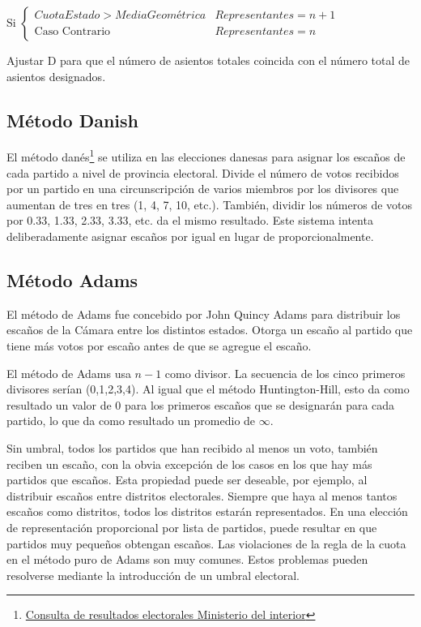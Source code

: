 \documentclass[12pt,a4paper,]{book}
\let\rmarkdownfootnote\footnote%
\def\footnote{\protect\rmarkdownfootnote}
\numberwithin{dummy}{section}
\theoremstyle{ocrenumbox}
\theoremstyle{blacknumex}
\theoremstyle{blacknumbox}
\theoremstyle{ocrenum}
\theoremstyle{ocrenum}
\begin{document}
Si
\(\begin{cases}CuotaEstado>MediaGeométrica & Representantes = n+1\\\textrm{Caso Contrario} & Representantes = n\end{cases}\)

Ajustar D para que el número de asientos totales coincida con el número
total de asientos designados.

\hypertarget{muxe9todo-danish}{%
\subsection{Método Danish}\label{muxe9todo-danish}}

El método danés\footnote{\href{http://www.infoelectoral.mir.es/min/}{Consulta
  de resultados electorales Ministerio del interior}} se utiliza en las
elecciones danesas para asignar los escaños de cada partido a nivel de
provincia electoral. Divide el número de votos recibidos por un partido
en una circunscripción de varios miembros por los divisores que aumentan
de tres en tres (1, 4, 7, 10, etc.). También, dividir los números de
votos por 0.33, 1.33, 2.33, 3.33, etc. da el mismo resultado. Este
sistema intenta deliberadamente asignar escaños por igual en lugar de
proporcionalmente.

\hypertarget{muxe9todo-adams}{%
\subsection{Método Adams}\label{muxe9todo-adams}}

El método de Adams fue concebido por John Quincy Adams para distribuir
los escaños de la Cámara entre los distintos estados. Otorga un escaño
al partido que tiene más votos por escaño antes de que se agregue el
escaño.

El método de Adams usa \(n-1\) como divisor. La secuencia de los cinco
primeros divisores serían (0,1,2,3,4). Al igual que el método
Huntington-Hill, esto da como resultado un valor de 0 para los primeros
escaños que se designarán para cada partido, lo que da como resultado un
promedio de \(\infty\).

Sin umbral, todos los partidos que han recibido al menos un voto,
también reciben un escaño, con la obvia excepción de los casos en los
que hay más partidos que escaños. Esta propiedad puede ser deseable, por
ejemplo, al distribuir escaños entre distritos electorales. Siempre que
haya al menos tantos escaños como distritos, todos los distritos estarán
representados. En una elección de representación proporcional por lista
de partidos, puede resultar en que partidos muy pequeños obtengan
escaños. Las violaciones de la regla de la cuota en el método puro de
Adams son muy comunes. Estos problemas pueden resolverse mediante la
introducción de un umbral electoral.
\end{document}
